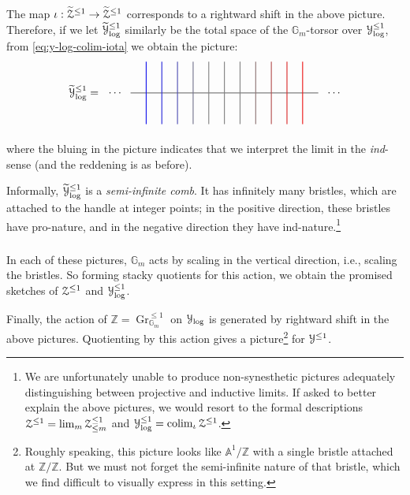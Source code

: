 \documentclass[reqno,11pt]{amsart}
\numberwithin{equation}{subsection}
\theoremstyle{remark}
\newcommand{\bA}{{\mathbb A}}
\newcommand{\bG}{{\mathbb G}}
\newcommand{\bZ}{{\mathbb Z}}
\newcommand{\sY}{{\EuScript Y}}
\newcommand{\sZ}{{\EuScript Z}}
\newcommand{\on}{\operatorname}
\newcommand{\Gr}{\on{Gr}}
\newcommand{\colim}{\on{colim}}
\renewcommand{\lim}{\on{lim}}
\begin{document}
The map $\iota:\widetilde{\sZ}^{\leq 1} \to \widetilde{\sZ}^{\leq 1}$ 
corresponds to a rightward
shift in the above picture. Therefore,
if we let $\widetilde{\sY}_{\log}^{\leq 1}$ similarly be the total space
of the $\bG_m$-torsor over $\sY_{\log}^{\leq 1}$, 
from \eqref{eq:y-log-colim-iota} we obtain the picture:
%
\[
\begin{tikzpicture}
\draw[gray, thick] (-3,0) -- (3,0);
\draw[gray, thick] (0,-1) -- (0,1);
\draw[gray, thick] (.5,-1) -- (.5,1);
\draw[gray!90!red, thick] (1,-1) -- (1,1);
\draw[gray!60!red, thick] (1.5,-1) -- (1.5,1);
\draw[gray!30!red, thick] (2,-1) -- (2,1);
\draw[gray!15!red, thick] (2.5,-1) -- (2.5,1);
\draw[gray, thick] (-.5,-1) -- (-.5,1);
\draw[gray!90!blue, thick] (-1,-1) -- (-1,1);
\draw[gray!60!blue, thick] (-1.5,-1) -- (-1.5,1);
\draw[gray!30!blue, thick] (-2,-1) -- (-2,1);
\draw[gray!15!blue, thick] (-2.5,-1) -- (-2.5,1);
\node at (-4.5, 0)   (a) {$\widetilde{\sY}_{\log}^{\leq 1} = $} ;
\node at (3.5, 0)   (b) {$\ldots$} ;
\node at (-3.5, 0)   (b) {$\ldots$} ;
\end{tikzpicture}
\]

\noindent where the bluing in the picture indicates that we interpret
the limit in the \emph{ind}-sense (and the reddening is as before).

Informally, $\widetilde{\sY}_{\log}^{\leq 1}$ is a \emph{semi-infinite comb}. It has
infinitely many bristles, which are attached to the handle at integer
points; in the positive direction, these bristles have
pro-nature, and in the negative direction they have ind-nature.\footnote{We 
are unfortunately unable to produce non-synesthetic
pictures adequately distinguishing between projective and inductive limits. 
If asked to better explain the above pictures, 
we would resort to the formal descriptions
$\sZ^{\leq 1} = \lim_m \sZ_{\leq m}^{\leq 1}$ and $\sY_{\log}^{\leq 1} = 
\colim_{\iota} \sZ^{\leq 1}$.}

\subsubsection{}

In each of these pictures, $\bG_m$ acts by scaling in the vertical direction, i.e.,
scaling the bristles. So forming stacky quotients for this action, 
we obtain the promised sketches of 
$\sZ^{\leq 1}$ and $\sY_{\log}^{\leq 1}$.

Finally, the action of $\bZ = \Gr_{\bG_m}^{\leq 1}$ on $\sY_{\log}$ is generated
by rightward shift in the above pictures. Quotienting by this action gives a 
picture\footnote{Roughly speaking, this picture looks like $\bA^1/\bZ$ with a 
single bristle attached at $\bZ/\bZ$. But we must not forget the semi-infinite nature
of that bristle, which we find difficult to visually express in this setting.} 
for $\sY^{\leq 1}$.
\end{document}
